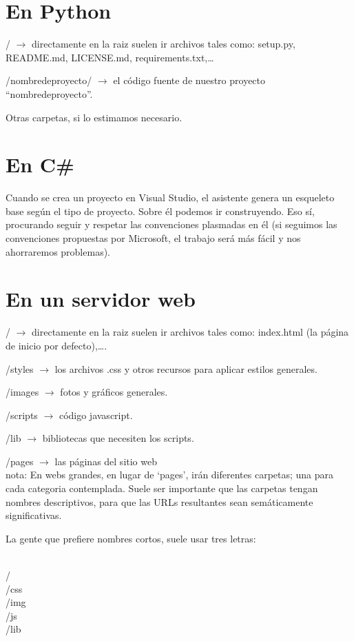 \documentclass[spanish,12pt,a4paper,final,oneside]{article}
\begin{document}
\section*{En Python}

{\LARGE /} $\rightarrow$ directamente en la raiz suelen ir archivos tales como: setup.py, README.md, LICENSE.md, requirements.txt,\ldots 

{\LARGE /nombredeproyecto/} $\rightarrow$ el código fuente de nuestro proyecto ``nombredeproyecto''.

Otras carpetas, si lo estimamos necesario.


\section*{En C\#}

Cuando se crea un proyecto en Visual Studio, el asistente genera un esqueleto base según el tipo de proyecto. Sobre él podemos ir construyendo. Eso sí, procurando seguir y respetar las convenciones plasmadas en él (si seguimos las convenciones propuestas por Microsoft, el trabajo será más fácil y nos ahorraremos problemas).


\section*{En un servidor web}

{\LARGE /} $\rightarrow$ directamente en la raiz suelen ir archivos tales como: {\LARGE index.html} (la página de inicio por defecto),\ldots.

{\LARGE /styles} $\rightarrow$ los archivos .css y otros recursos para aplicar estilos generales.

{\LARGE /images} $\rightarrow$ fotos y gráficos generales.

{\LARGE /scripts} $\rightarrow$ código javascript.

{\LARGE /lib} $\rightarrow$ bibliotecas que necesiten los scripts.

{\LARGE /pages} $\rightarrow$ las páginas del sitio web
\\nota: En webs grandes, en lugar de `pages', irán diferentes carpetas; una para cada categoria contemplada. Suele ser importante que las carpetas tengan nombres descriptivos, para que las URLs resultantes sean semáticamente significativas.

\vspace{1cm}

La gente que prefiere nombres cortos, suele usar tres letras:
\begin{LARGE}
\\/
\\/css
\\/img
\\/js
\\/lib
\end{LARGE}
\end{document}
